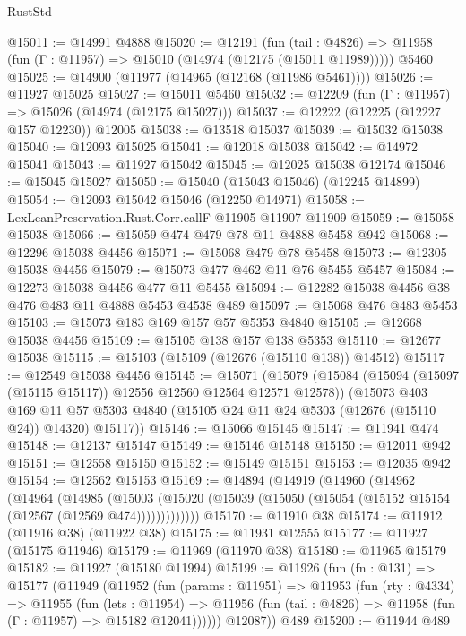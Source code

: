 \begin{lexlean}{RustStd}
\begin{coremodule}
@15011 := @14991 @4888
@15020 := @12191
    (fun (tail : @4826) => @11958 (fun (Γ : @11957) => @15010 (@14974 (@12175 (@15011 @11989)))))
    @5460
@15025 := @14900 (@11977 (@14965 (@12168 (@11986 @5461))))
@15026 := @11927 @15025
@15027 := @15011 @5460
@15032 := @12209 (fun (Γ : @11957) => @15026 (@14974 (@12175 @15027)))
@15037 := @12222 (@12225 (@12227 @157 @12230)) @12005
@15038 := @13518 @15037
@15039 := @15032 @15038
@15040 := @12093 @15025
@15041 := @12018 @15038
@15042 := @14972 @15041
@15043 := @11927 @15042
@15045 := @12025 @15038 @12174
@15046 := @15045 @15027
@15050 := @15040 (@15043 @15046) (@12245 @14899)
@15054 := @12093 @15042 @15046 (@12250 @14971)
@15058 := LexLeanPreservation.Rust.Corr.callF @11905 @11907 @11909
@15059 := @15058 @15038
@15066 := @15059 @474 @479 @78 @11 @4888 @5458 @942
@15068 := @12296 @15038 @4456
@15071 := @15068 @479 @78 @5458
@15073 := @12305 @15038 @4456
@15079 := @15073 @477 @462 @11 @76 @5455 @5457
@15084 := @12273 @15038 @4456 @477 @11 @5455
@15094 := @12282 @15038 @4456 @38 @476 @483 @11 @4888 @5453 @4538 @489
@15097 := @15068 @476 @483 @5453
@15103 := @15073 @183 @169 @157 @57 @5353 @4840
@15105 := @12668 @15038 @4456
@15109 := @15105 @138 @157 @138 @5353
@15110 := @12677 @15038
@15115 := @15103 (@15109 (@12676 (@15110 @138)) @14512)
@15117 := @12549 @15038 @4456
@15145 := @15071
    (@15079
      (@15084 (@15094 (@15097 (@15115 @15117)) @12556 @12560 @12564 @12571 @12578))
      (@15073
        @403
        @169
        @11
        @57
        @5303
        @4840
        (@15105 @24 @11 @24 @5303 (@12676 (@15110 @24)) @14320)
        @15117))
@15146 := @15066 @15145
@15147 := @11941 @474
@15148 := @12137 @15147
@15149 := @15146 @15148
@15150 := @12011 @942
@15151 := @12558 @15150
@15152 := @15149 @15151
@15153 := @12035 @942
@15154 := @12562 @15153
@15169 := @14894
    (@14919
      (@14960
        (@14962
          (@14964
            (@14985
              (@15003
                (@15020 (@15039 (@15050 (@15054 (@15152 @15154 (@12567 (@12569 @474)))))))))))))
@15170 := @11910 @38
@15174 := @11912 (@11916 @38) (@11922 @38)
@15175 := @11931 @12555
@15177 := @11927 (@15175 @11946)
@15179 := @11969 (@11970 @38)
@15180 := @11965 @15179
@15182 := @11927 (@15180 @11994)
@15199 := @11926
    (fun (fn : @131) =>
    @15177
      (@11949
        (@11952
          (fun (params : @11951) =>
          @11953
            (fun (rty : @4334) =>
            @11955
              (fun (lets : @11954) =>
              @11956 (fun (tail : @4826) => @11958 (fun (Γ : @11957) => @15182 @12041))))))
        @12087))
    @489
@15200 := @11944 @489

\end{coremodule}
\end{lexlean}
